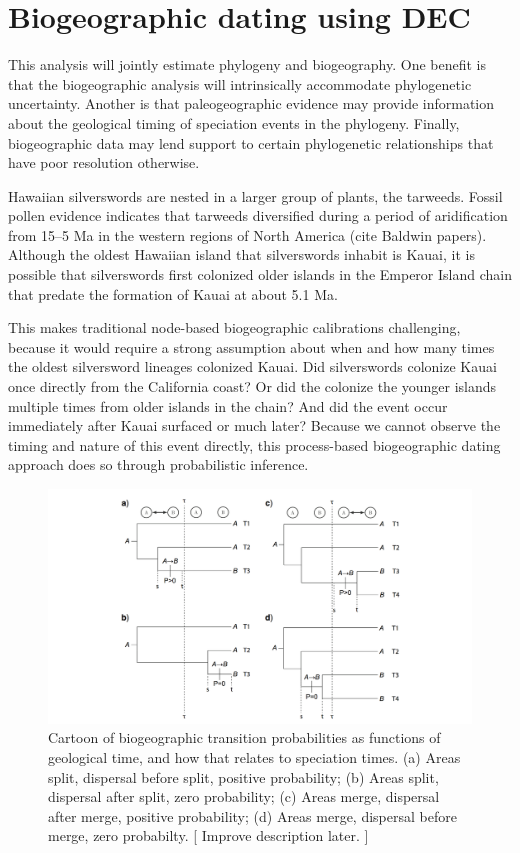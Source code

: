 

\section{Biogeographic dating using DEC}

This analysis will jointly estimate phylogeny and biogeography.
One benefit is that the biogeographic analysis will intrinsically accommodate phylogenetic uncertainty.
Another is that paleogeographic evidence may provide information about the geological timing of speciation events in the phylogeny.
Finally, biogeographic data may lend support to certain phylogenetic relationships that have poor resolution otherwise.

Hawaiian silverswords are nested in a larger group of plants, the tarweeds.
Fossil pollen evidence indicates that tarweeds diversified during a period of aridification from 15--5 Ma in the western regions of North America (cite Baldwin papers).
Although the oldest Hawaiian island that silverswords inhabit is Kauai, it is possible that silverswords first colonized older islands in the Emperor Island chain that predate the formation of Kauai at about 5.1 Ma.

This makes traditional node-based biogeographic calibrations challenging, because it would require a strong assumption about when and how many times the oldest silversword lineages colonized Kauai.
Did silverswords colonize Kauai once directly from the California coast? Or did the colonize the younger islands multiple times from older islands in the chain? And did the event occur immediately after Kauai surfaced or much later? Because we cannot observe the timing and nature of this event directly, this process-based biogeographic dating approach does so through probabilistic inference.

\begin{figure}[!ht]
\centering
\includegraphics[width=\textwidth]{figures/fig_biogeo_dating.png}
\caption{Cartoon of biogeographic transition probabilities as functions of geological time, and how that relates to speciation times. (a) Areas split, dispersal before split, positive probability; (b) Areas split, dispersal after split, zero probability; (c) Areas merge, dispersal after merge, positive probability; (d) Areas merge, dispersal before merge, zero probabilty. [ Improve description later. ]}
\end{figure}

